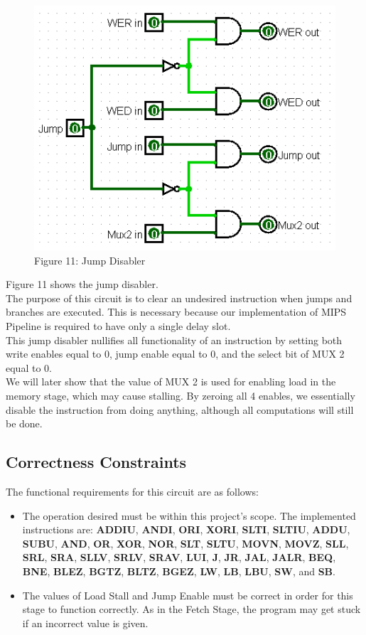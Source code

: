 \documentclass{article}
\begin{document}
\begin{figure}
\vspace{-1cm}
\begin{center}
\includegraphics[width=.4\textwidth]{JumpDisable.png}\\
Figure 11: Jump Disabler
\end{center}
\vspace{-1cm}
\end{figure}
Figure 11 shows the jump disabler. \\
The purpose of this circuit is to clear an undesired instruction when jumps and branches are executed. This is necessary because our implementation of MIPS Pipeline is required to have only a single delay slot.\\
This jump disabler nullifies all functionality of an instruction by setting both write enables equal to 0, jump enable equal to 0, and the select bit of MUX 2 equal to 0. \\
We will later show that the value of MUX 2 is used for enabling load in the memory stage, which may cause stalling. By zeroing all 4 enables, we essentially disable the instruction from doing anything, although all computations will still be done.

\subsection{Correctness Constraints}
The functional requirements for this circuit are as follows:
\begin{itemize}
\item
The operation desired must be within this project's scope. The implemented instructions are: \textbf{ADDIU}, \textbf{ANDI}, \textbf{ORI}, \textbf{XORI}, \textbf{SLTI}, \textbf{SLTIU}, \textbf{ADDU}, \textbf{SUBU}, \textbf{AND}, \textbf{OR}, \textbf{XOR}, \textbf{NOR}, \textbf{SLT}, \textbf{SLTU}, \textbf{MOVN}, \textbf{MOVZ}, \textbf{SLL}, \textbf{SRL}, \textbf{SRA}, \textbf{SLLV}, \textbf{SRLV}, \textbf{SRAV}, \textbf{LUI}, \textbf{J}, \textbf{JR}, \textbf{JAL}, \textbf{JALR}, \textbf{BEQ}, \textbf{BNE}, \textbf{BLEZ}, \textbf{BGTZ}, \textbf{BLTZ}, \textbf{BGEZ}, \textbf{LW}, \textbf{LB}, \textbf{LBU}, \textbf{SW}, and \textbf{SB}.

\item
The values of Load Stall and Jump Enable must be correct in order for this stage to function correctly. As in the Fetch Stage, the program may get stuck if an incorrect value is given.
\end{itemize}
\end{document}
